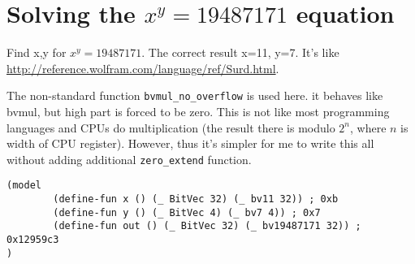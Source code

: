\section{Solving the $x^y=19487171$ equation}

Find x,y for $x^y=19487171$.
The correct result x=11, y=7.
It's like \url{http://reference.wolfram.com/language/ref/Surd.html}.

The non-standard function \verb|bvmul_no_overflow| is used here. it behaves like bvmul, but high part is forced to be zero.
This is not like most programming languages and CPUs do multiplication
(the result there is modulo $2^n$, where $n$ is width of CPU register).
However, thus it's simpler for me to write this all without adding additional \verb|zero_extend| function.



\begin{lstlisting}[caption=The solution]
(model
        (define-fun x () (_ BitVec 32) (_ bv11 32)) ; 0xb
        (define-fun y () (_ BitVec 4) (_ bv7 4)) ; 0x7
        (define-fun out () (_ BitVec 32) (_ bv19487171 32)) ; 0x12959c3
)
\end{lstlisting}

